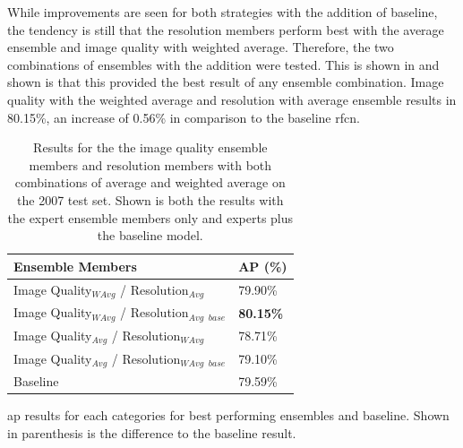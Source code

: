 While improvements are seen for both strategies with the addition of baseline, the tendency is still that the resolution members perform best with the average ensemble and image quality with weighted average. Therefore, the two combinations of ensembles with the addition were tested. This is shown in  and shown is that this provided the best result of any ensemble combination. Image quality with the weighted average and resolution with average ensemble results in 80.15\%, an increase of 0.56\% in comparison to the baseline \gls{rfcn}.

\begin{table}[h]
\centering
\caption{Results for the the image quality ensemble members and resolution members with both combinations of average and weighted average on the 2007 test set.  Shown is both the results with the expert ensemble members only and experts plus the baseline model.}
\label{tab:ensemble_comb_base}
\begin{tabular}{|l|l|}
\hline
\textbf{Ensemble Members}                  & \textbf{AP (\%)} \\ \hline
Image Quality$_{WAvg}$ / Resolution$_{Avg}$  & 79.90\% \\ \hline
Image Quality$_{WAvg}$ / Resolution$_{Avg}$ $_{base}$ & \textbf{80.15\%} \\ \hline
Image Quality$_{Avg}$ / Resolution$_{WAvg}$ & 78.71\% \\ \hline
Image Quality$_{Avg}$ / Resolution$_{WAvg}$ $_{base}$ & 79.10\% \\ \hline
Baseline                          & 79.59\% \\ \hline
\end{tabular}
\end{table}


\gls{ap} results for each categories for best performing ensembles and baseline. Shown in parenthesis is the difference to the baseline result.


